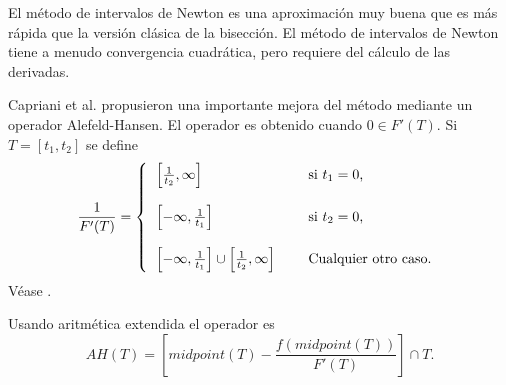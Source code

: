 El método de intervalos de Newton es una aproximación muy buena que es más rápida que la versión clásica de la bisección. El método de intervalos de Newton tiene a menudo convergencia cuadrática, pero requiere del cálculo de las derivadas.

Capriani et al. propusieron una importante mejora del método mediante un operador Alefeld-Hansen. El operador es obtenido cuando $0 \in F'(T)$. Si $T = [t_1,t_2]$ se define
\begin{equation}
\frac{1}{F'(T)} = \left\{ \begin{tabular}{l l l}
$\left[ \frac{1}{t_2}, \infty \right]$ & & si $t_1 = 0$, \\ \\
$\left[ - \infty, \frac{1}{t_1} \right]$ & & si $t_2 = 0$, \\ \\
$\left[ - \infty, \frac{1}{t_1} \right] \cup \left[ \frac{1}{t_2}, \infty \right]$ & & Cualquier otro caso.
\end{tabular}
\right.
\nonumber
\end{equation}
Véase \cite{Alefeld70,Hansen78}.

Usando aritmética extendida\cite{Hansen03} el operador es
\begin{equation}
AH(T) = \left[ midpoint(T) - \frac{f(midpoint(T))}{F'(T)} \right] \cap T.
\nonumber
\end{equation}

